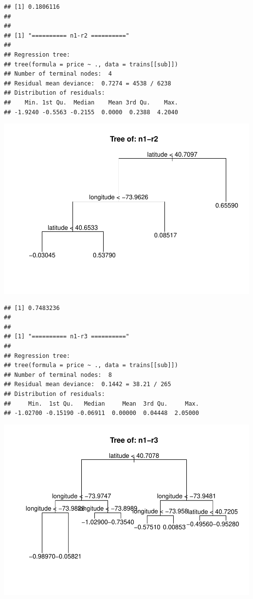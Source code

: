\documentclass[
]{article}
\begin{document}
\begin{verbatim}
## [1] 0.1806116
## 
## 
## [1] "========== n1-r2 =========="
## 
## Regression tree:
## tree(formula = price ~ ., data = trains[[sub]])
## Number of terminal nodes:  4 
## Residual mean deviance:  0.7274 = 4538 / 6238 
## Distribution of residuals:
##    Min. 1st Qu.  Median    Mean 3rd Qu.    Max. 
## -1.9240 -0.5563 -0.2155  0.0000  0.2388  4.2040
\end{verbatim}

\includegraphics{project-code_files/figure-latex/unnamed-chunk-14-7.pdf}

\begin{verbatim}
## [1] 0.7483236
## 
## 
## [1] "========== n1-r3 =========="
## 
## Regression tree:
## tree(formula = price ~ ., data = trains[[sub]])
## Number of terminal nodes:  8 
## Residual mean deviance:  0.1442 = 38.21 / 265 
## Distribution of residuals:
##     Min.  1st Qu.   Median     Mean  3rd Qu.     Max. 
## -1.02700 -0.15190 -0.06911  0.00000  0.04448  2.05000
\end{verbatim}

\includegraphics{project-code_files/figure-latex/unnamed-chunk-14-8.pdf}
\end{document}
